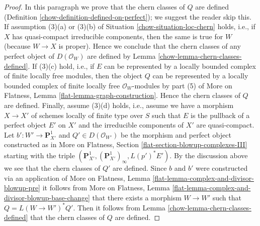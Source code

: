 \begin{proof}
\medskip\noindent
In this paragraph we prove that the chern classes of $Q$ are defined
(Definition \ref{chow-definition-defined-on-perfect}); we suggest the reader skip
this. If assumption (3)(a) or (3)(b) of Situation \ref{chow-situation-loc-chern}
holds, i.e., if $X$ has quasi-compact irreducible components, then the
same is true for $W$ (because $W \to X$ is proper). Hence we conclude that
the chern classes of any perfect object of $D(\mathcal{O}_W)$ are defined by
Lemma \ref{chow-lemma-chern-classes-defined}. If (3)(c) hold, i.e., if
$E$ can be represented by a locally bounded complex of finite locally
free modules, then the object $Q$ can be represented by a locally bounded
complex of finite locally free $\mathcal{O}_W$-modules by part (5) of
More on Flatness, Lemma \ref{flat-lemma-graph-construction}. Hence the
chern classes of $Q$ are defined. Finally, assume (3)(d) holds, i.e.,
assume we have a morphism $X \to X'$ of schemes locally of finite type
over $S$ such that $E$ is the pullback of a perfect object $E'$ on $X'$ and
the irreducible components of $X'$ are quasi-compact.
Let $b' : W' \to \mathbf{P}^1_{X'}$ and $Q' \in D(\mathcal{O}_{W'})$
be the morphism and perfect object constructed as
in More on Flatness, Section \ref{flat-section-blowup-complexes-III}
starting with the triple
$(\mathbf{P}^1_{X'}, (\mathbf{P}^1_{X'})_\infty, L(p')^*E')$.
By the discussion above we see that the chern classes of $Q'$
are defined. Since $b$ and $b'$ were constructed via an application of
More on Flatness, Lemma \ref{flat-lemma-complex-and-divisor-blowup-pre}
it follows from
More on Flatness, Lemma \ref{flat-lemma-complex-and-divisor-blowup-base-change}
that there exists a morphism $W \to W'$ such that
$Q = L(W \to W')^*Q'$. Then it follows from
Lemma \ref{chow-lemma-chern-classes-defined}
that the chern classes of $Q$ are defined.
\end{proof}

